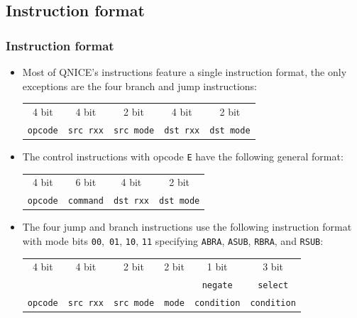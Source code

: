 \documentclass{beamer}
\begin{document}
  \subsection{Instruction format}
   \begin{frame}
    \frametitle{Instruction format}
    \begin{itemize}
     \item Most of QNICE's instructions feature a single instruction 
      format, the only exceptions are the four branch and jump instructions:
      \begin{center}
       \begin{tabular}{|c||c|c||c|c|}
        \hline
         4 bit&4 bit&2 bit&4 bit&2 bit\\
         {\tt opcode}&{\tt src rxx}&{\tt src mode}&
                      {\tt dst rxx}&{\tt dst mode}\\
        \hline
       \end{tabular}
      \end{center}
     \item The control instructions with opcode \texttt{E} have the 
      following general format:
      \begin{center}
       \begin{tabular}{|c||c||c|c|}
        \hline
         4 bit&6 bit&4 bit&2 bit\\
         {\tt opcode}&{\tt command}&{\tt dst rxx}&\texttt{dst mode}\\
        \hline
       \end{tabular}
      \end{center}
     \item The four jump and branch instructions use the following instruction
      format with mode bits \texttt{00}, \texttt{01}, \texttt{10},
      \texttt{11} specifying \texttt{ABRA}, \texttt{ASUB}, \texttt{RBRA}, 
      and \texttt{RSUB}:
      {\scriptsize
       \begin{center}
        \begin{tabular}{|c||c|c||c||c|c|}
         \hline
          4 bit&4 bit&2 bit&2 bit&1 bit&3 bit\\
               &     &     &     &{\tt negate}&{\tt select}\\
          {\tt opcode}&{\tt src rxx}&{\tt src mode}&
                       {\tt mode}&{\tt condition}&{\tt condition}\\
         \hline
        \end{tabular}
       \end{center}
      }
    \end{itemize}
   \end{frame}
%
\end{document}
